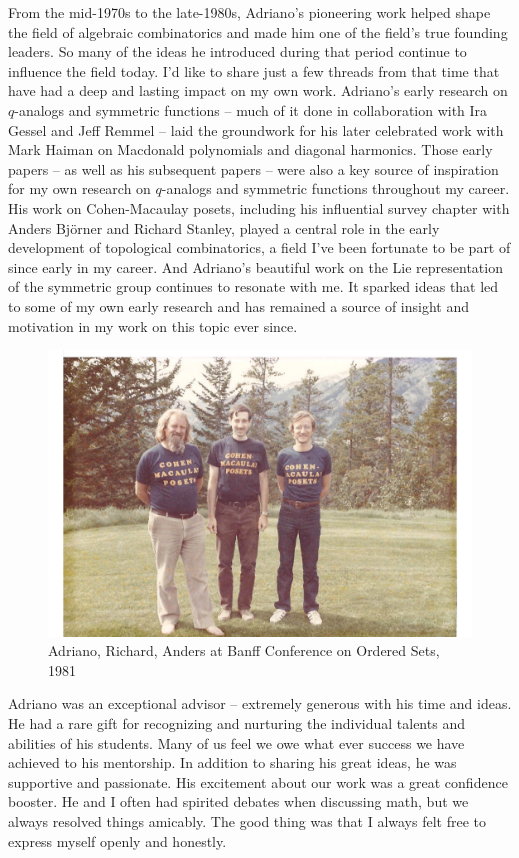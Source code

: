 \documentclass{notices}
\begin{document}
From the mid-1970s to the late-1980s, Adriano's pioneering work helped shape the field of algebraic combinatorics and made him  one of the field's true founding leaders. So many of the ideas he introduced during that  period continue to influence the field today. I'd like to share just a few threads from that time that have had a deep and lasting impact on my own work.
 Adriano's early research on 
$q$-analogs and symmetric functions -- much of it done in collaboration with Ira Gessel and Jeff Remmel -- laid the groundwork for his later celebrated work with Mark Haiman on Macdonald polynomials and diagonal harmonics. Those early papers -- as well as his subsequent papers --  were also a key source of inspiration for my own research on $q$-analogs and symmetric functions throughout my career. His work on Cohen-Macaulay posets, including his influential survey chapter  with Anders Bj\"orner and Richard Stanley, played a central role in the early development of topological combinatorics,  a field I've been fortunate to be part of since  early in my career. And Adriano's beautiful work on the Lie representation of the symmetric group continues to resonate with me. It sparked ideas that led to some of my own early research and has remained a source of insight and motivation in my work on this topic ever since.

\begin{figure}
    \centering
    \includegraphics[width=\linewidth]{Michelle_Wachs/cmposets.pdf} 
  {\footnotesize Adriano, Richard, Anders at Banff Conference on Ordered Sets, 1981}
\end{figure}
Adriano was an exceptional advisor -- extremely generous with his time and ideas. He had a rare gift for recognizing and nurturing the individual talents and abilities of his students.   Many of us feel we owe what ever success we have achieved to his mentorship.  In addition to sharing his great ideas, he was supportive and passionate.  His excitement about our work was a great confidence booster.  He and I often had spirited debates when discussing math,  but we always resolved things amicably.   The good thing was that I always felt free to express myself openly and honestly. 
\end{document}
